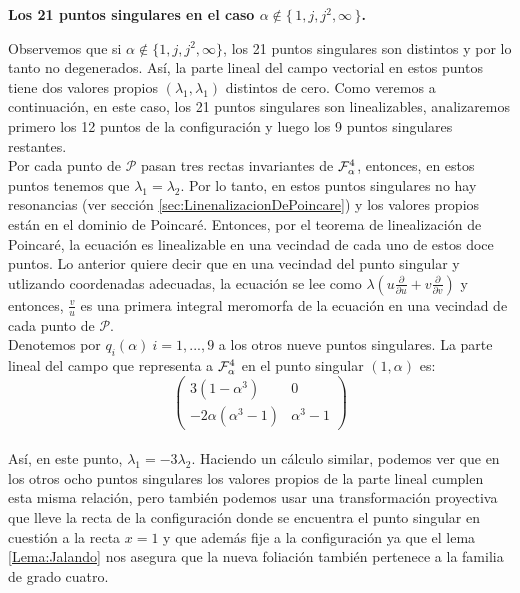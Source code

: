 \textbf{Los 21 puntos singulares en el caso $\alpha\notin\{\, 1,j,j^{2},\infty \, \}$.}

Observemos que si $\alpha\notin\{1,j,j^{2},\infty \}$, los 21 puntos singulares son distintos y por lo tanto no degenerados. Así, la parte lineal del campo vectorial en estos puntos tiene dos valores propios $(\lambda_{1},\lambda_{1})$ distintos de cero. Como veremos a continuación, en este caso, los 21 puntos singulares son linealizables, analizaremos primero los 12 puntos de la configuración y luego los 9 puntos singulares restantes.\\

Por cada punto de $\mathcal{P}$ pasan tres rectas invariantes de $\Fol[4]{\alpha}$, entonces, en estos puntos tenemos que $\lambda_{1} = \lambda_{2}$. Por lo tanto, en estos puntos singulares no hay resonancias (ver sección \ref{sec:LinenalizacionDePoincare}) y los valores propios están en el dominio de Poincaré. Entonces, por el teorema de linealización de Poincaré, la ecuación es linealizable en una vecindad de cada uno de estos doce puntos. Lo anterior quiere decir que en una vecindad del punto singular y utlizando coordenadas adecuadas, la ecuación se lee como $ \lambda (u \frac{\partial}{\partial u} + v \frac{\partial}{\partial v})$ y entonces, $\frac{v}{u}$ es una primera integral meromorfa de la ecuación en una vecindad de cada punto de $\mathcal{P}$.
\\

Denotemos por $q_{i}(\alpha) \ i=1,...,9$ a los otros nueve puntos singulares. La parte lineal del campo que representa a $\Fol[4]{\alpha}$  en el punto singular $(1,\alpha )$ es:
\\

$$\begin{pmatrix}

3(1-\alpha^{3}) & 0 \\
-2\alpha(\alpha^{3}-1) & \alpha^{3} -1

\end{pmatrix}$$
\\

\noindent Así, en este punto, $\lambda_{1} = -3\lambda_{2}$. Haciendo un cálculo similar, podemos ver que en los otros ocho puntos singulares los valores propios de la parte lineal cumplen esta misma relación, pero también podemos usar una transformación proyectiva que lleve la recta de la configuración donde se encuentra el punto singular en cuestión a la recta $x=1$ y que además fije a la configuración  ya que el lema \ref{Lema:Jalando} nos asegura que la nueva foliación también pertenece a la familia de grado cuatro.
\\


